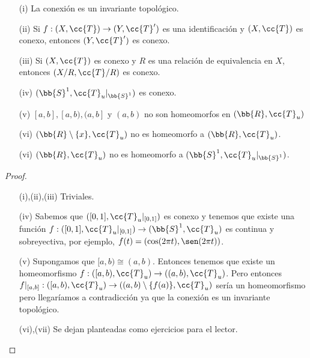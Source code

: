 \begin{coro}
    \begin{enumerate}
        \item[(i)] La conexión es un invariante topológico.
        \item[(ii)] Si $f:(X, \cc{T})\to (Y, \cc{T}')$ es una identificación y $(X, \cc{T})$ es conexo, entonces $(Y, \cc{T}')$ es conexo.
        \item[(iii)] Si $(X, \cc{T})$ es conexo y $R$ es una relación de equivalencia en $X$, entonces $(X/R, \cc{T}/R)$ es conexo.
        \item[(iv)] $(\bb{S}^1, \cc{T}_u|_{\bb{S}^1})$ es conexo.
        \item[(v)] $[a,b], [a,b), (a,b]$ y $(a,b)$ no son homeomorfos en $(\bb{R}, \cc{T}_u)$ 
        \item[(vi)] $(\bb{R}\setminus \{x\}, \cc{T}_u)$ no es homeomorfo a $(\bb{R}, \cc{T}_u)$.
        \item[(vi)] $(\bb{R}, \cc{T}_u)$ no es homeomorfo a $(\bb{S}^1, \cc{T}_u|_{\bb{S}^1})$.  
    \end{enumerate}
    \begin{proof}\
        \begin{enumerate}
            \item[(i),(ii),(iii)] Triviales.
            \item[(iv)] Sabemos que $([0,1], \cc{T}_u|_{[0,1]})$ es conexo y tenemos que existe una función $f:([0,1], \cc{T}_u|_{[0,1]})\to (\bb{S}^1, \cc{T}_u)$ es continua y sobreyectiva, por ejemplo, $f(t)=(\cos(2\pi t), \sen(2\pi t))$.
            \item[(v)] Supongamos que $[a,b)\cong(a,b)$. Entonces tenemos que existe un homeomorfismo $f:([a,b), \cc{T}_u)\to ((a,b), \cc{T}_u)$. Pero entonces $f|_{[a,b]}:([a,b), \cc{T}_u)\to ((a,b)\setminus \{f(a)\}, \cc{T}_u)$ sería un homeomorfismo pero llegaríamos a contradicción ya que la conexión es un invariante topológico.
            \item[(vi),(vii)] Se dejan planteadas como ejercicios para el lector.  
        \end{enumerate}
    \end{proof}
\end{coro}

